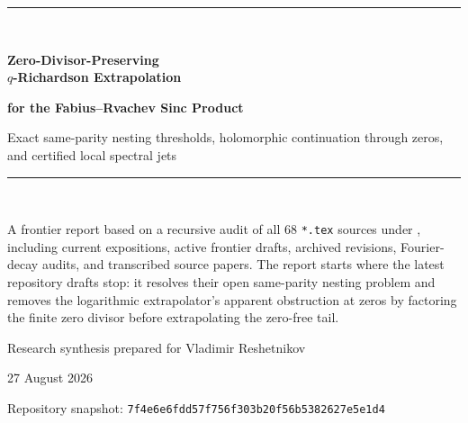 \documentclass[11pt,oneside]{article}
\numberwithin{equation}{section}
\theoremstyle{frontier}
\theoremstyle{definition}
\theoremstyle{remark}
\newcommand{\commitsha}{\nolinkurl{7f4e6e6fdd57f756f303b20f56b5382627e5e1d4}}
\begin{document}
\hypersetup{pageanchor=false}

\begin{titlepage}
\centering
\vspace*{1.2cm}
{\color{navy}\rule{0.84\textwidth}{1.2pt}}\\[1.0cm]
{\Huge\bfseries\color{navy} Zero-Divisor-Preserving\\[0.16em]
$q$-Richardson Extrapolation\par}
\vspace{0.35cm}
{\LARGE\bfseries\color{ink} for the Fabius--Rvachev Sinc Product\par}
\vspace{0.75cm}
{\Large\color{teal}Exact same-parity nesting thresholds, holomorphic continuation through zeros,\\
and certified local spectral jets\par}
\vspace{1.0cm}
{\color{navy}\rule{0.84\textwidth}{0.6pt}}\\[1.2cm]

\begin{minipage}{0.86\textwidth}
\large
A frontier report based on a recursive audit of all 68 \texttt{*.tex} sources under
, including current expositions, active frontier drafts,
archived revisions, Fourier-decay audits, and transcribed source papers.  The report starts
where the latest repository drafts stop: it resolves their open same-parity nesting problem
and removes the logarithmic extrapolator's apparent obstruction at zeros by factoring the
finite zero divisor before extrapolating the zero-free tail.
\end{minipage}

\vfill
{\large Research synthesis prepared for Vladimir Reshetnikov\par}
\vspace{0.25cm}
{\large 27 August 2026\par}
\vspace{0.65cm}
{\small Repository snapshot: \commitsha\par}
\end{titlepage}

\hypersetup{pageanchor=true}
\end{document}
